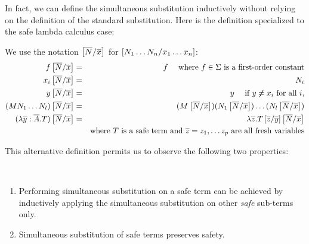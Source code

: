 In fact, we can define the simultaneous substitution inductively
without relying on the definition of the standard substitution. Here
is the definition specialized to the safe lambda calculus case:

\begin{dfn}
\label{dnf:safe_simsubst}
 We use the notation
$\left[ \overline{N}/\overline{x} \right]$ for $\left[ N_1 \ldots N_n/x_1
\ldots x_n \right]$:
\begin{eqnarray*}
f \left[ \overline{N}/\overline{x} \right] &=& f \quad \mbox{ where $f\in\Sigma$ is a first-order constant} \\
x_i \left[ \overline{N}/\overline{x} \right] &=& N_i\\
 y \left[ \overline{N}/\overline{x} \right] &=& y \quad \mbox{ if } y \not \neq x_i \mbox{ for all } i,\\
(M N_1 \ldots N_l) \left[ \overline{N}/\overline{x} \right] &=& (M \left[ \overline{N}/\overline{x} \right]) (N_1 \left[ \overline{N}/\overline{x} \right]) \ldots  (N_l \left[ \overline{N}/\overline{x} \right])\\
(\lambda \overline{y} : \overline{A}. T)
\left[ \overline{N}/\overline{x} \right] &=& \lambda \overline{z} . T
\left[ \overline{z}/\overline{y} \right]
\left[ \overline{N}/\overline{x} \right] \\
&& \mbox{where $T$ is a safe
term and $\overline{z} = z_1, \ldots z_p$ are all fresh variables}
\end{eqnarray*}
\end{dfn}

This alternative definition permits us to observe the following two
properties:

\begin{property}
\label{prop:subst_preserve_safety} \
\begin{enumerate}
\item Performing simultaneous substitution on a safe term can be
achieved by inductively applying the simultaneous substitution on
other \emph{safe} sub-terms only.

\item Simultaneous substitution of safe terms preserves safety.
\end{enumerate}
\end{property}

